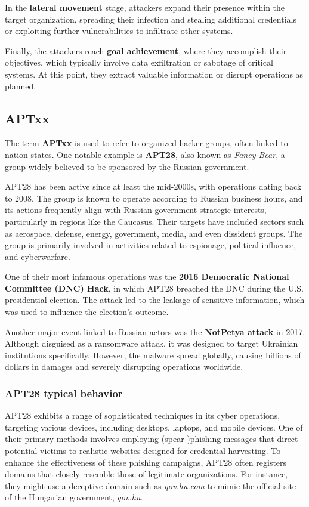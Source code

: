In the \textbf{lateral movement} stage, attackers expand their
presence within the target organization, spreading their infection and
stealing additional credentials or exploiting further vulnerabilities
to infiltrate other systems.

Finally, the attackers reach \textbf{goal achievement}, where they
accomplish their objectives, which typically involve data exfiltration
or sabotage of critical systems. At this point, they extract valuable
information or disrupt operations as planned.

\subsection{APTxx}
The term \textbf{APTxx} is used to refer to organized hacker groups,
often linked to nation-states. One notable example is \textbf{APT28},
also known as \textit{Fancy Bear}, a group widely believed to be
sponsored by the Russian government.

APT28 has been active since at least the mid-2000s, with operations
dating back to 2008. The group is known to operate according to
Russian business hours, and its actions frequently align with Russian
government strategic interests, particularly in regions like the
Caucasus. Their targets have included sectors such as aerospace,
defense, energy, government, media, and even dissident groups. The
group is primarily involved in activities related to espionage,
political influence, and cyberwarfare.

One of their most infamous operations was the \textbf{2016 Democratic
National Committee (DNC) Hack}, in which APT28 breached the DNC during
the U.S. presidential election. The attack led to the leakage of
sensitive information, which was used to influence the election’s
outcome.

Another major event linked to Russian actors was the \textbf{NotPetya
attack} in 2017. Although disguised as a ransomware attack, it was
designed to target Ukrainian institutions specifically. However, the
malware spread globally, causing billions of dollars in damages and
severely disrupting operations worldwide.

\subsubsection{APT28 typical behavior}


APT28 exhibits a range of sophisticated techniques in its cyber
operations, targeting various devices, including desktops, laptops,
and mobile devices. One of their primary methods involves employing
(spear-)phishing messages that direct potential victims to realistic
websites designed for credential harvesting. To enhance the
effectiveness of these phishing campaigns, APT28 often registers
domains that closely resemble those of legitimate organizations. For
instance, they might use a deceptive domain such as
\textit{qov.hu.com} to mimic the official site of the Hungarian
government, \textit{gov.hu}.

